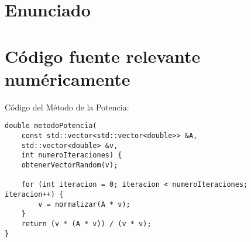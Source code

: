\appendix

\section{Enunciado}
\label{ap:enunciado}


\section{Código fuente relevante numéricamente}

Código del Método de la Potencia:
\begin{lstlisting}
double metodoPotencia(
    const std::vector<std::vector<double>> &A,
    std::vector<double> &v,
    int numeroIteraciones) {
    obtenerVectorRandom(v);

    for (int iteracion = 0; iteracion < numeroIteraciones; iteracion++) {
        v = normalizar(A * v);
    }
    return (v * (A * v)) / (v * v);
}
\end{lstlisting}